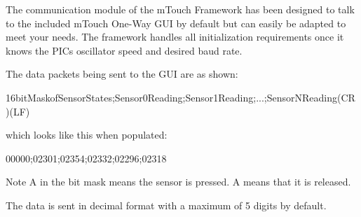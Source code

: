 The communication module of the m\+Touch Framework has been designed to talk to the included m\+Touch One-\/\+Way G\+U\+I by default but can easily be adapted to meet your needs. The framework handles all initialization requirements once it knows the P\+I\+C\textquotesingle{}s oscillator speed and desired baud rate.

The data packets being sent to the G\+U\+I are as shown\+: 
\begin{DoxyCode}
16bitMaskofSensorStates;Sensor0Reading;Sensor1Reading;...;SensorNReading(CR)(LF)
\end{DoxyCode}
 which looks like this when populated\+: 
\begin{DoxyCode}
00000;02301;02354;02332;02296;02318
\end{DoxyCode}
 \begin{DoxyNote}{Note}
A {} in the bit mask means the sensor is pressed. A {} means that it is released.
\end{DoxyNote}
The data is sent in decimal format with a maximum of 5 digits by default. 